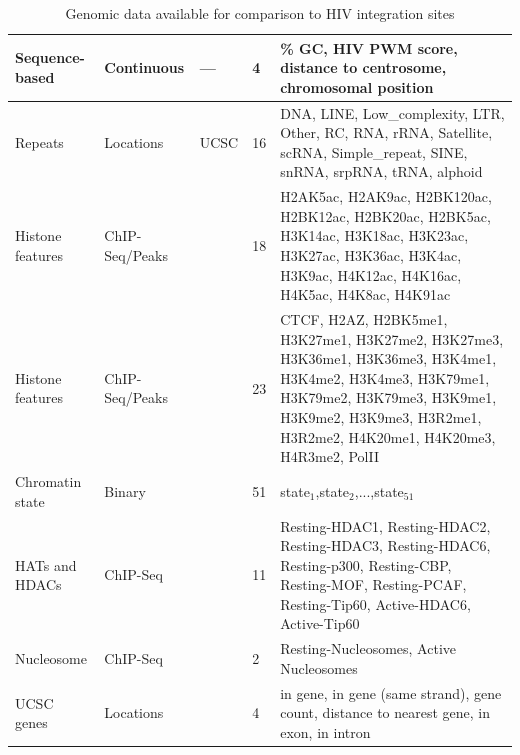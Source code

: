 \documentclass[../sherrill-Mix_thesis.tex]{subfiles}
\begin{document}
\begin{table}
{\begin{tabular}{|p{1.2in}|l|p{0.79in}|l|P{2.3in}|}
			\hline
			Sequence-based    & Continuous     & ---                           & 4               & \% GC, HIV PWM score, distance to centrosome, chromosomal position                                                                                                                                               \\ 
			\hline
			Repeats           & Locations      & UCSC \citep{Meyer2013}        & 16              & DNA, LINE, Low\_complexity, LTR, Other, RC, RNA, rRNA, Satellite, scRNA, Simple\_repeat, SINE, snRNA, srpRNA, tRNA, alphoid                                                                                      \\ 
			\hline
			Histone features  & ChIP-Seq/Peaks & \citet{Wang2008a}             & 18              & H2AK5ac, H2AK9ac, H2BK120ac, H2BK12ac, H2BK20ac, H2BK5ac, H3K14ac, H3K18ac, H3K23ac, H3K27ac, H3K36ac, H3K4ac, H3K9ac, H4K12ac, H4K16ac, H4K5ac, H4K8ac, H4K91ac                                                 \\ 
			\hline
			Histone features  & ChIP-Seq/Peaks & \citet{Barski2007}            & 23              & CTCF, H2AZ, H2BK5me1, H3K27me1, H3K27me2, H3K27me3, H3K36me1, H3K36me3, H3K4me1, H3K4me2, H3K4me3, H3K79me1, H3K79me2, H3K79me3, H3K9me1, H3K9me2, H3K9me3, H3R2me1, H3R2me2, H4K20me1, H4K20me3, H4R3me2, PolII \\ 
			\hline
			Chromatin state   & Binary         & \citet{Ernst2010}             & 51              & state$_1$,state$_2$,...,state$_{51}$                                                                                                                                                                             \\ 
			\hline
			HATs and HDACs    & ChIP-Seq       & \citet{Wang2009a}             & 11              & Resting-HDAC1, Resting-HDAC2, Resting-HDAC3, Resting-HDAC6, Resting-p300, Resting-CBP, Resting-MOF, Resting-PCAF, Resting-Tip60, Active-HDAC6, Active-Tip60                                                      \\ 
			\hline
			Nucleosome        & ChIP-Seq       & \citet{Schones2008}           & 2               & Resting-Nucleosomes, Active Nucleosomes                                                                                                                                                                          \\ 
			\hline
			UCSC genes        & Locations      & \citet{Hsu2006}               & 4               & in gene, in gene (same strand), gene count, distance to nearest gene, in exon, in intron                                                                                                                         \\ 
			\hline
		\end{tabular}
		}
		\caption[Genomic data available for comaprison to integration sites]{Genomic data available for comparison to HIV integration sites}
		\label{tabVariables} \end{table} %
\end{document}
